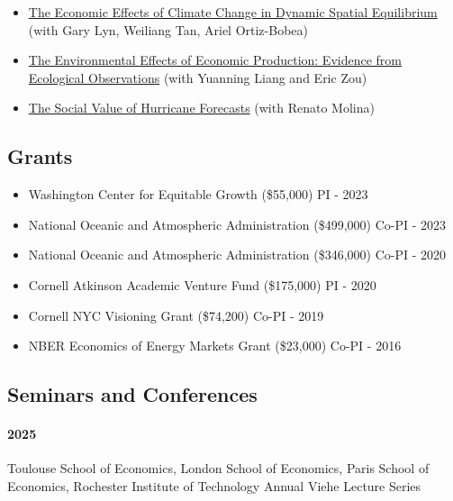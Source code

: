 \documentclass[11pt]{res} %
\begin{document}
\begin{resume}
\begin{itemize} %
	\item[] \href{https://osf.io/preprints/socarxiv/usghb}{The Economic Effects of Climate Change in Dynamic Spatial Equilibrium} (with Gary Lyn, Weiliang Tan, Ariel Ortiz-Bobea)
	\item[] \href{https://osf.io/preprints/socarxiv/qy76a}{The Environmental Effects of Economic Production: Evidence from Ecological Observations} (with Yuanning Liang and Eric Zou)
	\item[] \href{https://ivanrudik.com}{The Social Value of Hurricane Forecasts} (with Renato Molina)
\end{itemize}
 
\vspace{-.2in}

\subsection{Grants}
\begin{itemize}  \itemsep -1pt
	\item[] Washington Center for Equitable Growth (\$55,000) \hfill PI - 2023
	\item[] National Oceanic and Atmospheric Administration (\$499,000) \hfill Co-PI - 2023
	\item[] National Oceanic and Atmospheric Administration (\$346,000) \hfill Co-PI - 2020
	\item[] Cornell Atkinson Academic Venture Fund (\$175,000) \hfill PI - 2020
	\item[] Cornell NYC Visioning Grant (\$74,200) \hfill Co-PI - 2019
	\item[] NBER Economics of Energy Markets Grant (\$23,000) \hfill Co-PI - 2016
\end{itemize}

\vspace{-.2in}

\subsection{Seminars and Conferences}\vspace{-.1in}
\paragraph{2025} Toulouse School of Economics, London School of Economics, Paris School of Economics, Rochester Institute of Technology Annual Viehe Lecture Series \vspace{-.2in}

\end{resume}
\end{document}
